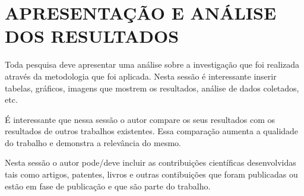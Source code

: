 \section{APRESENTAÇÃO E ANÁLISE DOS RESULTADOS}
Toda pesquisa deve apresentar uma análise sobre a investigação que foi realizada através da metodologia que foi aplicada. Nesta sessão é interessante inserir tabelas, gráficos, imagens que mostrem os resultados, análise de dados coletados, etc.

É interessante que nessa sessão o autor compare os seus resultados com os resultados de outros trabalhos existentes. Essa comparação aumenta a qualidade do trabalho e demonstra a relevância do mesmo. 

Nesta sessão o autor pode/deve incluir as contribuições científicas desenvolvidas tais como artigos, patentes, livros e outras contibuições que foram publicadas ou estão em fase de publicação e que são parte do trabalho.